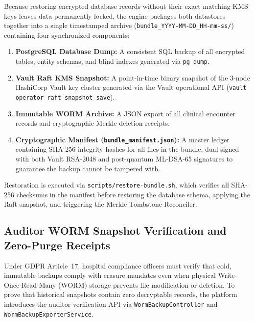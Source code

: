 Because restoring encrypted database records without their exact matching KMS keys leaves data permanently locked, the engine packages both datastores together into a single timestamped archive (\texttt{bundle\_YYYY-MM-DD\_HH-mm-ss/}) containing four synchronized components:
\begin{enumerate}
    \item \textbf{PostgreSQL Database Dump:} A consistent SQL backup of all encrypted tables, entity schemas, and blind indexes generated via \texttt{pg\_dump}.
    \item \textbf{Vault Raft KMS Snapshot:} A point-in-time binary snapshot of the 3-node HashiCorp Vault key cluster generated via the Vault operational API (\texttt{vault operator raft snapshot save}).
    \item \textbf{Immutable WORM Archive:} A JSON export of all clinical encounter records and cryptographic Merkle deletion receipts.
    \item \textbf{Cryptographic Manifest (\texttt{bundle\_manifest.json}):} A master ledger containing SHA-256 integrity hashes for all files in the bundle, dual-signed with both Vault RSA-2048 and post-quantum ML-DSA-65 signatures to guarantee the backup cannot be tampered with.
\end{enumerate}

Restoration is executed via \texttt{scripts/restore-bundle.sh}, which verifies all SHA-256 checksums in the manifest before restoring the database schema, applying the Raft snapshot, and triggering the Merkle Tombstone Reconciler.

\subsection{Auditor WORM Snapshot Verification and Zero-Purge Receipts}

Under GDPR Article~17, hospital compliance officers must verify that cold, immutable backups comply with erasure mandates even when physical Write-Once-Read-Many (WORM) storage prevents file modification or deletion. To prove that historical snapshots contain zero decryptable records, the platform introduces the auditor verification API via \texttt{WormBackupController} and \texttt{WormBackupExporterService}.

